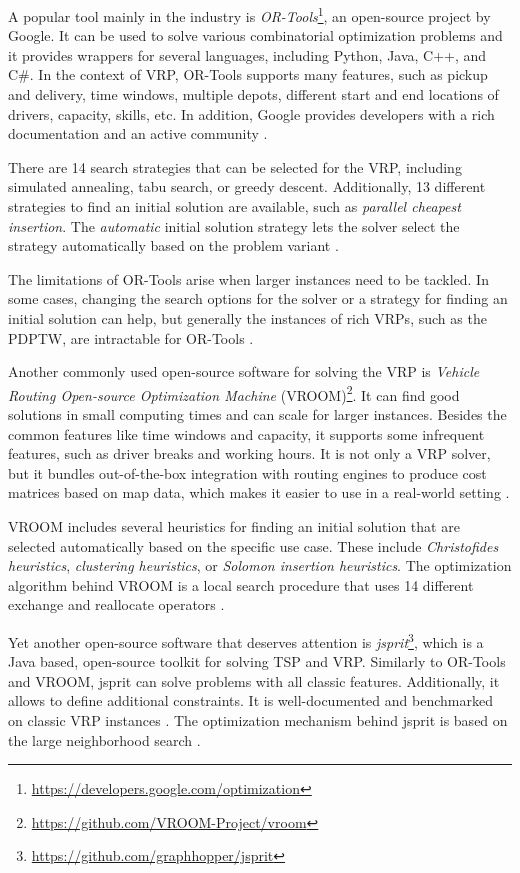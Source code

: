 A popular tool mainly in the industry is \emph{OR-Tools}\footnote{\url{https://developers.google.com/optimization}}, an open-source project by Google. It can be used to solve various combinatorial optimization problems and it provides wrappers for several languages, including Python, Java, C++, and C\#. In the context of VRP, OR-Tools supports many features, such as pickup and delivery, time windows, multiple depots, different start and end locations of drivers, capacity, skills, etc. In addition, Google provides developers with a rich documentation and an active community \cite{ortools, Karkula2020}.

There are 14 search strategies that can be selected for the VRP, including simulated annealing, tabu search, or greedy descent. Additionally, 13 different strategies to find an initial solution are available, such as \emph{parallel cheapest insertion}. The \emph{automatic} initial solution strategy lets the solver select the strategy automatically based on the problem variant \cite{ortools}.

The limitations of OR-Tools arise when larger instances need to be tackled. In some cases, changing the search options for the solver or a strategy for finding an initial solution can help, but generally the instances of rich VRPs, such as the PDPTW, are intractable for OR-Tools \cite{Karkula2020}.

Another commonly used open-source software for solving the VRP is \emph{Vehicle Routing Open-source Optimization Machine} (VROOM)\footnote{\url{https://github.com/VROOM-Project/vroom}}. It can find good solutions in small computing times and can scale for larger instances. Besides the common features like time windows and capacity, it supports some infrequent features, such as driver breaks and working hours. It is not only a VRP solver, but it bundles out-of-the-box integration with routing engines to produce cost matrices based on map data, which makes it easier to use in a real-world setting \cite{vroom}.

VROOM includes several heuristics for finding an initial solution that are selected automatically based on the specific use case. These include \emph{Christofides heuristics}, \emph{clustering heuristics}, or \emph{Solomon insertion heuristics}. The optimization algorithm behind VROOM is a local search procedure that uses 14 different exchange and reallocate operators \cite{Braysy2005, Karkula2020}.

Yet another open-source software that deserves attention is \emph{jsprit}\footnote{\url{https://github.com/graphhopper/jsprit}}, which is a Java based, open-source toolkit for solving TSP and VRP. Similarly to OR-Tools and VROOM, jsprit can solve problems with all classic features. Additionally, it allows to define additional constraints. It is well-documented and benchmarked on classic VRP instances \cite{jsprit}. The optimization mechanism behind jsprit is based on the large neighborhood search \cite{Karkula2020}.
